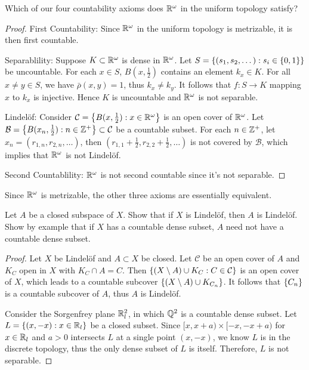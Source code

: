 \documentclass[12pt,a4paper]{article}
\begin{document}
    \begin{ex}
        Which of our four countability axioms does $\mathbb{R}^\omega$ in the uniform topology satisfy?
    \end{ex}
    \begin{proof}
        First Countability: Since $\mathbb{R}^\omega$ in the uniform topology is metrizable, it is then first countable.

        Separablility: Suppose $K\subset\mathbb{R}^\omega$ is dense in $\mathbb{R}^\omega$. Let $S=\left\{(s_1,s_2,\dots):s_i\in\left\{0,1\right\}\right\}$ be uncountable. For each $x\in S$, $B(x,\frac{1}{2})$ contains an element $k_x\in K$. For all $x\neq y\in S$, we have $\bar{\rho}(x,y)=1$, thus $k_x\neq k_y$. It follows that $f:S\to K$ mapping $x$ to $k_x$ is injective. Hence $K$ is uncountable and $\mathbb{R}^\omega$ is not separable.

        Lindel\"of: Consider $\mathcal{C}=\left\{B(x,\frac{1}{2}):x\in\mathbb{R}^\omega\right\}$ is an open cover of $\mathbb{R}^\omega$. Let $\mathcal{B}=\left\{B(x_n,\frac{1}{2}):n\in\mathbb{Z}^+\right\}\subset\mathcal{C}$ be a countable subset. For each $n\in\mathbb{Z}^+$, let $x_n=(r_{1,n},r_{2,n},\dots)$, then $(r_{1,1}+\frac{1}{2},r_{2,2}+\frac{1}{2},\dots)$ is not covered by $\mathcal{B}$, which implies that $\mathbb{R}^\omega$ is not Lindel\"of.

        Second Countablility: $\mathbb{R}^\omega$ is not second countable since it's not separable.
    \end{proof}
    \begin{remark}
        Since $\mathbb{R}^\omega$ is metrizable, the other three axioms are essentially equivalent.
    \end{remark}
    \hfill    

    \begin{ex}
        Let $A$ be a closed subspace of $X$. Show that if $X$ is Lindel\"of, then $A$ is Lindel\"of. Show by example that if $X$ has a countable dense subset, $A$ need not have a countable dense subset.
    \end{ex}
    \begin{proof}
        Let $X$ be Lindel\"of and $A\subset X$ be closed. Let $\mathcal{C}$ be an open cover of $A$ and $K_C$ open in $X$ with $K_C\cap A=C$. Then $\left\{(X\setminus A)\cup K_C:C\in\mathcal{C}\right\}$ is an open cover of $X$, which leads to a countable subcover $\left\{(X\setminus A)\cup K_{C_n}\right\}$. It follows that $\left\{C_n\right\}$ is a countable subcover of $A$, thus $A$ is Lindel\"of.

        Consider the Sorgenfrey plane $\mathbb{R}_l^2$, in which $\mathbb{Q}^2$ is a countable dense subset. Let $L=\left\{(x,-x):x\in\mathbb{R}_l\right\}$ be a closed subset. Since $[x,x+a)\times[-x,-x+a)$ for $x\in\mathbb{R}_l$ and $a>0$ intersects $L$ at a single point $(x,-x)$, we know $L$ is in the discrete topology, thus the only dense subset of $L$ is itself. Therefore, $L$ is not separable. 
    \end{proof}
    \hfill
\end{document}
